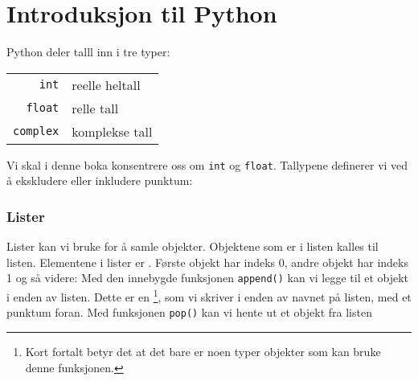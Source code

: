 





\section{Introduksjon til Python}

Python deler talll inn i tre typer:
\begin{center}
	\begin{tabular}{r|l}
		\texttt{int} & reelle heltall \\
		\texttt{float} & relle tall \\
		\texttt{complex} & komplekse tall
	\end{tabular} 
\end{center}
Vi skal i denne boka konsentrere oss om \texttt{int} og \texttt{float}. Tallypene definerer vi ved å ekskludere eller inkludere punktum:

\subsubsection{Lister}
Lister kan vi bruke for å samle objekter. Objektene som er i listen kalles  til listen.
Elementene i lister er . Første objekt har indeks 0, andre objekt har indeks 1 og så videre:
Med den innebygde funksjonen \texttt{append()} kan vi legge til et objekt i enden av listen. Dette er en \footnote{Kort fortalt betyr det at det bare er noen typer objekter som kan bruke denne funksjonen.}, som vi skriver i enden av navnet på listen, med et punktum foran.
Med funksjonen \texttt{pop()} kan vi hente ut et objekt fra listen
